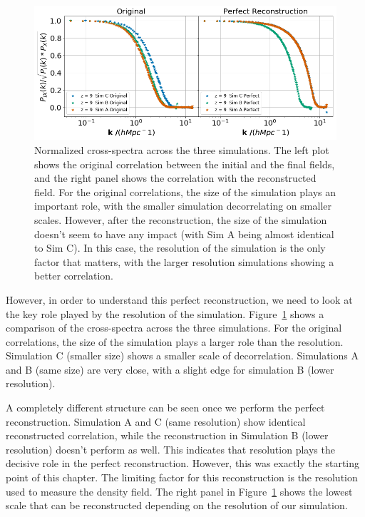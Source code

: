 \begin{figure}
    \centering
    \includegraphics[width=1\columnwidth]{images/perfRecon/simComp.png}%
    
    \caption{
    Normalized cross-spectra across the three simulations. The left plot shows the original correlation between the initial and the final fields, and the right panel shows the correlation with the reconstructed field. For the original correlations, the size of the simulation plays an important role, with the smaller simulation decorrelating on smaller scales. However, after the reconstruction, the size of the simulation doesn't seem to have any impact (with Sim A being almost identical to Sim C). In this case, the resolution of the simulation is the only factor that matters, with the larger resolution simulations showing a better correlation.
    }
    
    \label{fig:3.3}
\end{figure}
However, in order to understand this perfect reconstruction, we need to look at the key role played by the resolution of the simulation. Figure~\ref{fig:3.3} shows a comparison of the cross-spectra across the three simulations. For the original correlations, the size of the simulation plays a larger role than the resolution. Simulation C (smaller size) shows a smaller scale of decorrelation. Simulations A and B (same size) are very close, with a slight edge for simulation B (lower resolution). 

A completely different structure can be seen once we perform the perfect reconstruction. Simulation A and C (same resolution) show identical reconstructed correlation, while the reconstruction in Simulation B (lower resolution) doesn't perform as well. This indicates that resolution plays the decisive role in the perfect reconstruction. However, this was exactly the starting point of this chapter. The limiting factor for this reconstruction is the resolution used to measure the density field. The right panel in Figure~\ref{fig:3.3} shows the lowest scale that can be reconstructed depending on the resolution of our simulation.

